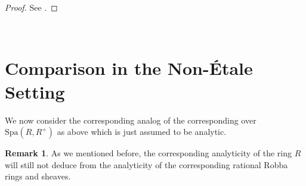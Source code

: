 \documentclass[12pt]{amsart}
\theoremstyle{definition}
\newtheorem{remark}[theorem]{Remark}
\numberwithin{equation}{section}
\begin{document}
\begin{proof}
See \cite[Theorem 4.5.7]{KL2}.	
\end{proof}





\


\section{Comparison in the Non-\'Etale Setting}


\indent We now consider the corresponding analog of the corresponding \cite[Chapter 4.6]{KL2} over $\mathrm{Spa}(R,R^+)$ as above which is just assumed to be analytic.




\begin{remark}
As we mentioned before, the corresponding analyticity of the ring $R$ will still not deduce from the analyticity of the corresponding rational Robba rings and sheaves.	
\end{remark}
\end{document}
